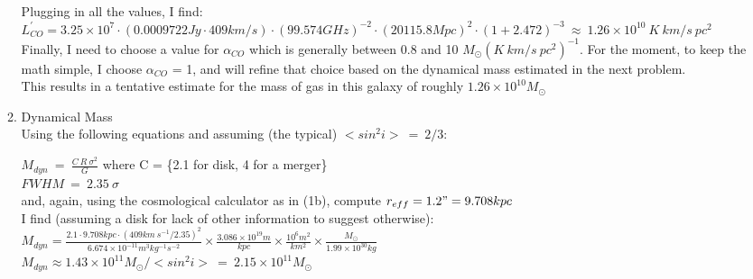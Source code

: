 \documentclass[11pt]{article}
\begin{document}
\begin{enumerate}
\begin{enumerate}
	Plugging in all the values, I find:\\
	
	$L^{'}_{CO} = 3.25 \times 10^{7}\cdot(0.0009722 Jy \cdot 409 km/s)\cdot(99.574 GHz)^{-2}\cdot(20115.8 Mpc)^2\cdot(1+2.472)^{-3}\ \approx \ 1.26 \times 10^{10}\ K\ km/s\ pc^2$\\
	
	Finally, I need to choose a value for $\alpha_{CO}$ which is generally between 0.8 and 10 $M_{\odot} (K\ km/s\ pc^2)^{-1}.$ For the moment, to keep the math simple, I choose $\alpha_{CO}$ = 1, and will refine that choice based on the dynamical mass estimated in the next problem. \\
	
	This results in a tentative estimate for the mass of gas in this galaxy of roughly $1.26 \times 10^{10} M_{\odot}$\\
	
	
	
	
	
	\item Dynamical Mass%
	\\

	Using the following equations and assuming (the typical) $<sin^2i>\ =\ 2/3$:
	
	\hspace{10mm} $M_{dyn}\ =\ \frac{\displaystyle C\ R\ \sigma^2}{\displaystyle  G} $ where C = \{2.1 for disk, 4 for a merger\} \\
	
	\hspace{10mm} $FWHM\ =\ 2.35\ \sigma$\\
	
	and, again, using the cosmological calculator as in (1b), compute $r_{eff} = 1.2" = 9.708 kpc$\\
	
	I find (assuming a disk for lack of other information to suggest otherwise):\\
	
	 $M_{dyn} = \frac{\displaystyle 2.1 \cdot 9.708 kpc \cdot (409km\ s^{-1}/2.35)^2}{\displaystyle 6.674 \times 10^{-11} m^3 kg^{-1} s^{-2}} \times \frac{\displaystyle 3.086\times 10^{19} m}{\displaystyle kpc} \times \frac{\displaystyle 10^{6} m^2}{\displaystyle km^2} \times \frac{\displaystyle M_{\odot}}{\displaystyle 1.99 \times 10^{30} kg} $\\
	 
	 $M_{dyn} \approx 1.43 \times 10^{11} M_{\odot} / < sin^2i >\ =\ 2.15 \times 10^{11} M_{\odot}$\\
	 

\end{enumerate}
\end{enumerate}
\end{document}
